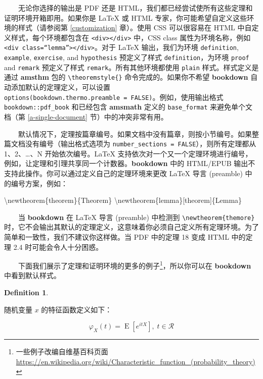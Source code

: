 \documentclass[
  12pt,
]{krantz}
\newenvironment{Shaded}{\begin{snugshade}}{\end{snugshade}}
\newcommand{\FunctionTok}[1]{\textcolor[rgb]{0.00,0.00,0.00}{#1}}
\newcommand{\NormalTok}[1]{#1}
\theoremstyle{definition}
\newtheorem{definition}{Definition}[chapter]
\theoremstyle{definition}
\theoremstyle{definition}
\theoremstyle{definition}
\theoremstyle{remark}
\begin{document}
  无论你选择的输出是 PDF 还是 HTML，我们都已经尝试使所有这些定理和证明环境开箱即用。如果你是 LaTeX 或 HTML 专家，你可能希望自定义这些环境的样式（请参阅第 \ref{customization} 章）。使用 CSS 可以很容易在 HTML 中自定义样式，每个环境都包含在 \texttt{\textless{}div\textgreater{}\textless{}/div\textgreater{}} 中，CSS class 属性为环境名称，例如 \texttt{\textless{}div\ class=“lemma”\textgreater{}\textless{}/div\textgreater{}}。对于 LaTeX 输出，我们为环境 \texttt{definition}, \texttt{example}, \texttt{exercise}, and \texttt{hypothesis} 预定义了样式 \texttt{definition}，为环境 \texttt{proof} and \texttt{remark} 预定义了样式 \texttt{remark}。所有其他环境都使用 \texttt{plain} 样式。样式定义是通过 \textbf{amsthm} 包的 \texttt{\textbackslash{}theoremstyle\{\}} 命令完成的。如果你不希望 \textbf{bookdown} 自动添加默认的定理定义，可以设置 \texttt{options(bookdown.thermo.preamble\ =\ FALSE)}。例如，使用输出格式 \texttt{bookdown::pdf\_book} 和已经包含 \textbf{amsmath} 定义的 \texttt{base\_format} 来避免单个文档（第 \ref{a-single-document} 节）中的冲突非常有用。

  默认情况下，定理按篇章编号。如果文档中没有篇章，则按小节编号。如果整篇文档没有编号（输出格式选项为 \texttt{number\_sections\ =\ FALSE}），则所有定理都从 1、2、\ldots、N 开始依次编号。LaTeX 支持依次对一个又一个定理环境进行编号，例如，让定理和引理共享同一个计数器。\textbf{bookdown} 中的 HTML/EPUB 输出不支持此操作。你可以通过定义自己的定理环境来更改 LaTeX 导言 (preamble) 中的编号方案，例如：

\begin{Shaded}
\begin{Highlighting}[]
\FunctionTok{\textbackslash{}newtheorem}\NormalTok{\{theorem\}\{Theorem\}}
\FunctionTok{\textbackslash{}newtheorem}\NormalTok{\{lemma\}[theorem]\{Lemma\}}
\end{Highlighting}
\end{Shaded}

  当 \textbf{bookdown} 在 LaTeX 导言 (preamble) 中检测到 \texttt{\textbackslash{}newtheorem\{themore\}} 时，它不会输出其默认的定理定义，这意味着你必须自己定义所有定理环境。为了简单和一致性，我们不建议你这样做。当 PDF 中的定理 18 变成 HTML 中的定理 2.4 时可能会令人十分困惑。

  下面我们展示了定理和证明环境的更多的例子\footnote{一些例子改编自维基百科页面 \url{https://en.wikipedia.org/wiki/Characteristic_function_(probability_theory)}}，所以你可以在 \textbf{bookdown} 中看到默认样式。

\begin{definition}
\protect\hypertarget{def:unlabeled-div-1}{}\label{def:unlabeled-div-1}

随机变量 \(x\) 的特征函数定义如下：

\[\varphi _{X}(t)=\operatorname {E} \left[e^{itX}\right], \; t\in\mathcal{R}\]

\end{definition}
\end{document}
